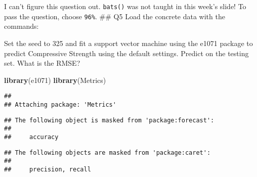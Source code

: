 \documentclass[]{article}
\newenvironment{Shaded}{\begin{snugshade}}{\end{snugshade}}
\newcommand{\KeywordTok}[1]{\textcolor[rgb]{0.13,0.29,0.53}{\textbf{#1}}}
\newcommand{\DataTypeTok}[1]{\textcolor[rgb]{0.13,0.29,0.53}{#1}}
\newcommand{\DecValTok}[1]{\textcolor[rgb]{0.00,0.00,0.81}{#1}}
\newcommand{\StringTok}[1]{\textcolor[rgb]{0.31,0.60,0.02}{#1}}
\newcommand{\OperatorTok}[1]{\textcolor[rgb]{0.81,0.36,0.00}{\textbf{#1}}}
\newcommand{\NormalTok}[1]{#1}
\begin{document}
I can't figure this question out. \texttt{bats()} was not taught in this
week's slide! To pass the question, choose \texttt{96\%}. \#\# Q5 Load
the concrete data with the commands:

\begin{Shaded}
\end{Shaded}

Set the seed to 325 and fit a support vector machine using the e1071
package to predict Compressive Strength using the default settings.
Predict on the testing set. What is the RMSE?

\begin{Shaded}
\begin{Highlighting}[]
\KeywordTok{library}\NormalTok{(e1071)}
\KeywordTok{library}\NormalTok{(Metrics)}
\end{Highlighting}
\end{Shaded}

\begin{verbatim}
## 
## Attaching package: 'Metrics'
\end{verbatim}

\begin{verbatim}
## The following object is masked from 'package:forecast':
## 
##     accuracy
\end{verbatim}

\begin{verbatim}
## The following objects are masked from 'package:caret':
## 
##     precision, recall
\end{verbatim}

\begin{Shaded}
\end{Shaded}
\end{document}
